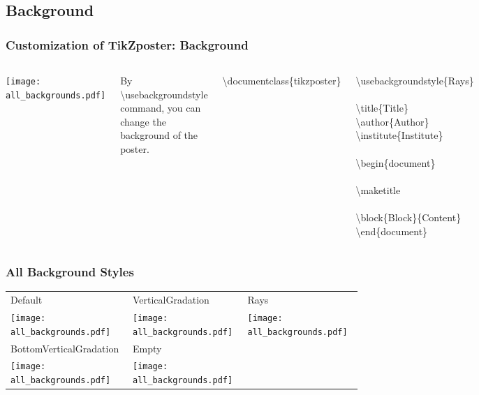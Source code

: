 \documentclass[9pt]{beamer}
\newcommand{\bs}{\textbackslash}   %
\begin{document}
\subsection{Background}

\begin{frame}
  \frametitle{Customization of TikZposter: Background}
  
  \begin{columns}[c]
    \texttt{[image: all\_backgrounds.pdf]}

    By \bs usebackgroundstyle command, you can change the background of the poster.

    \medskip
    \hspace{0.2cm}
    \begin{minipage}{.6\textwidth}\small
      \bs documentclass\{tikzposter\}
      
      \bs usebackgroundstyle\{Rays\}\\
      \\
      \bs title\{Title\}\\
      \bs author\{Author\}\\
      \bs institute\{Institute\}\\
      \\
      \bs begin\{document\}\\
      \\
      \bs maketitle\\
      \\
      \bs block\{Block\}\{Content\}\\
      \bs end\{document\}
    \end{minipage}

  \end{columns}
\end{frame}

\begin{frame}
  \frametitle{All Background Styles}
  
  \small
  \begin{tabular}[t]{@{}p{3.5cm}@{~~~}p{3.5cm}@{~~~}p{3.5cm}}
    Default & VerticalGradation & Rays\\[-0.03cm]
    \texttt{[image: all\_backgrounds.pdf]} &
    \texttt{[image: all\_backgrounds.pdf]} &
    \texttt{[image: all\_backgrounds.pdf]} \\ [0.05cm]
    BottomVerticalGradation & Empty & \\[-0.03cm]
    \texttt{[image: all\_backgrounds.pdf]} &
    \texttt{[image: all\_backgrounds.pdf]} &
  \end{tabular}
\end{frame}
\end{document}
